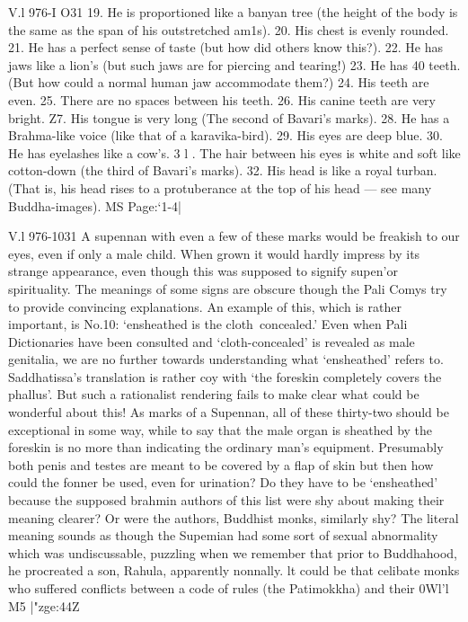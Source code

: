    
   
   V.l 976-I O31
   19. He is proportioned like a banyan tree (the height of the body is the same
   as the span of his outstretched am1s).
   20. His chest is evenly rounded.
   21. He has a perfect sense of taste (but how did others know this?).
   22. He has jaws like a lion's (but such jaws are for piercing and tearing!)
   23. He has 40 teeth. (But how could a normal human jaw accommodate
   them?)
   24. His teeth are even.
   25. There are no spaces between his teeth.
   26. His canine teeth are very bright.
   Z7. His tongue is very long (The second of Bavari's marks).
   28. He has a Brahma-like voice (like that of a karavika-bird).
   29. His eyes are deep blue.
   30. He has eyelashes like a cow's.
   3 l . The hair between his eyes is white and soft like cotton-down (the third of
   Bavari's marks).
   32. His head is like a royal turban. (That is, his head rises to a protuberance at
   the top of his head — see many Buddha-images).
   MS Page:`1-4|
   
   
   
   V.l 976-1031
   A supennan with even a few of these marks would be freakish to our eyes,
   even if only a male child. When grown it would hardly impress by its strange
   appearance, even though this was supposed to signify supen'or spirituality. The
   meanings of some signs are obscure though the Pali Comys try to provide
   convincing explanations. An example of this, which is rather important, is
   No.10: `ensheathed is the cloth~concealed.' Even when Pali Dictionaries have
   been consulted and `cloth-concealed' is revealed as male genitalia, we are no
   further towards understanding what `ensheathed' refers to. Saddhatissa's
   translation is rather coy with `the foreskin completely covers the phallus'. But
   such a rationalist rendering fails to make clear what could be wonderful about
   this! As marks of a Supennan, all of these thirty-two should be exceptional in
   some way, while to say that the male organ is sheathed by the foreskin is no more
   than indicating the ordinary man's equipment. Presumably both penis and testes
   are meant to be covered by a ﬂap of skin but then how could the fonner be used,
   even for urination? Do they have to be `ensheathed' because the supposed
   brahmin authors of this list were shy about making their meaning clearer? Or
   were the authors, Buddhist monks, similarly shy? The literal meaning sounds as
   though the Supemian had some sort of sexual abnormality which was
   undiscussable, puzzling when we remember that prior to Buddhahood, he
   procreated a son, Rahula, apparently nonnally. lt could be that celibate monks
   who suffered conﬂicts between a code of rules (the Patimokkha) and their 0Wl'l
   M5 |"zge:44Z
   
